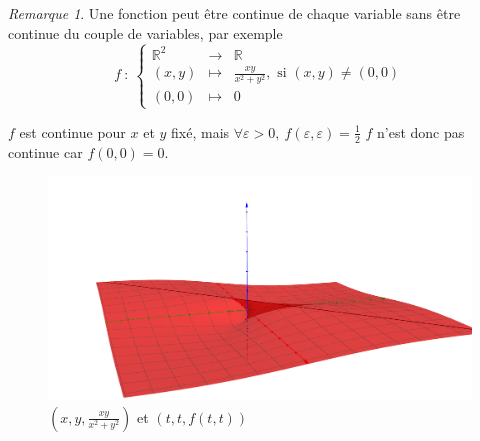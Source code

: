 \documentclass[]{article}
\theoremstyle{remark}
\newtheorem{myrem}{Remarque}
\theoremstyle{definition}
\begin{document}
\begin{myrem}
	Une fonction peut être continue de chaque variable sans être continue du couple de variables, par exemple
	$$f ~ : ~ \left\{
	\begin{array}{ccl}
		\mathbb{R}^2 & \longrightarrow & \mathbb{R} \\
		(x, y) & \longmapsto & \frac{xy}{x^2+y^2}, \text{ si } (x, y) \neq (0, 0) \\
		(0, 0) & \longmapsto & 0
	\end{array}
	\right.$$
	
	$f$ est continue pour $x$ et $y$ fixé, mais $\forall \varepsilon > 0, ~ f(\varepsilon, \varepsilon) = \frac{1}{2}$
	$f$ n'est donc pas continue car $f(0, 0)=0$.
	
		\begin{figure}[h!]
			\centering
			\includegraphics[width=550pt]{Continue_sur_chaque_variable}
			\caption{$\left(x, y, \frac{xy}{x^2+y^2}\right)$ et $(t, t, f(t, t))$}
		\end{figure}
\end{myrem}
\end{document}
